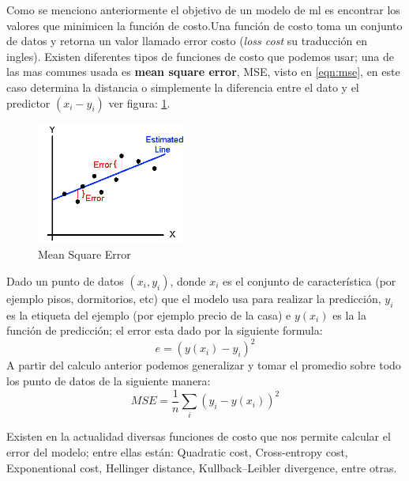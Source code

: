 Como se menciono anteriormente el objetivo de un modelo de \ac{ml} es encontrar los valores que minimicen la función de costo.Una función de costo toma un conjunto de datos y retorna un valor llamado error costo (\textit{loss cost} su traducción en ingles). Existen diferentes tipos de funciones de costo que podemos usar; una de las mas comunes usada es \textbf{mean square error}, MSE, visto en \ref{eqn:mse}, en este caso determina la distancia o simplemente la diferencia entre el dato y el predictor $(x_i - y_i) $ ver figura: \ref{Fig:mse}.
\begin{figure}[H] \centering
  \includegraphics[height=4cm,keepaspectratio=true,clip=true]{imagenes/MarcoTeorico/mse-cost.png}
  \caption{Mean Square Error }\label{Fig:mse}
\end{figure}

Dado un punto de datos $(x_i,y_i) $, donde $x_i $ es el conjunto de característica (por ejemplo pisos, dormitorios, etc) que el modelo usa para realizar la predicción, $y_i $ es la etiqueta del ejemplo (por ejemplo precio de la casa) e $y(x_i)$ es la la función de predicción; el error esta dado por la siguiente formula:
\begin{equation}\label{eqn:error-mse}
e = (y(x_i) - y_i)^2
\end{equation} 
A partir del calculo anterior podemos generalizar y tomar el promedio sobre todo los punto de datos de la siguiente manera:
\begin{equation}
MSE =  \frac{1}{n}\sum_{i}(y_i - y(x_i))^2
\end{equation}

Existen en la actualidad diversas funciones de costo que nos permite calcular el error del modelo; entre ellas están: Quadratic cost, Cross-entropy cost, Exponentional cost, Hellinger distance, Kullback–Leibler divergence, entre otras.


